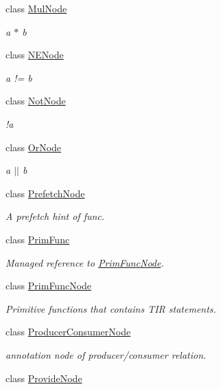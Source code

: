\begin{DoxyCompactItemize}
class \hyperlink{classtvm_1_1tir_1_1MulNode}{Mul\+Node}
\begin{DoxyCompactList}\small\item\em a $\ast$ b \end{DoxyCompactList}\item 
class \hyperlink{classtvm_1_1tir_1_1NENode}{N\+E\+Node}
\begin{DoxyCompactList}\small\item\em a != b \end{DoxyCompactList}\item 
class \hyperlink{classtvm_1_1tir_1_1NotNode}{Not\+Node}
\begin{DoxyCompactList}\small\item\em !a \end{DoxyCompactList}\item 
class \hyperlink{classtvm_1_1tir_1_1OrNode}{Or\+Node}
\begin{DoxyCompactList}\small\item\em a $\vert$$\vert$ b \end{DoxyCompactList}\item 
class \hyperlink{classtvm_1_1tir_1_1PrefetchNode}{Prefetch\+Node}
\begin{DoxyCompactList}\small\item\em A prefetch hint of func. \end{DoxyCompactList}\item 
class \hyperlink{classtvm_1_1tir_1_1PrimFunc}{Prim\+Func}
\begin{DoxyCompactList}\small\item\em Managed reference to \hyperlink{classtvm_1_1tir_1_1PrimFuncNode}{Prim\+Func\+Node}. \end{DoxyCompactList}\item 
class \hyperlink{classtvm_1_1tir_1_1PrimFuncNode}{Prim\+Func\+Node}
\begin{DoxyCompactList}\small\item\em Primitive functions that contains T\+IR statements. \end{DoxyCompactList}\item 
class \hyperlink{classtvm_1_1tir_1_1ProducerConsumerNode}{Producer\+Consumer\+Node}
\begin{DoxyCompactList}\small\item\em annotation node of producer/consumer relation. \end{DoxyCompactList}\item 
class \hyperlink{classtvm_1_1tir_1_1ProvideNode}{Provide\+Node}

\end{DoxyCompactItemize}
